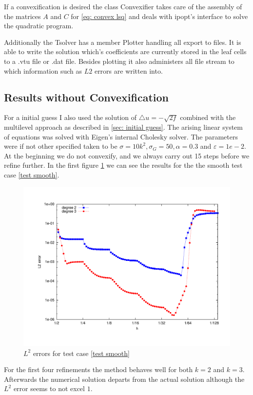 If a convexification is desired the class Convexifier takes care of the assembly of the matrices $A$ and $C$ for \eqref{eq: convex lsq} and deals with ipopt's interface to solve the quadratic program.

Additionally the Tsolver has a member Plotter handling all export to files. It is able to write the solution which's coefficients are currently stored in the leaf cells to a .vtu file or .dat file. Besides plotting it also administers all file stream to which information such as $L2$ errors are written into.

\subsection{Results without Convexification}

For a initial guess I also used the solution of $\triangle u = -\sqrt{2f}$ combined with the multilevel approach as described in \ref{sec: initial guess}.
The arising linear system of equations was solved with Eigen's internal Cholesky solver.
The parameters were if not other specified taken to be $\sigma=10 k^2, \sigma_G = 50, \alpha =
0.3$ and $\varepsilon = 1e-2$. At the beginning we do not convexify, and we always carry out 15 steps before we refine further. 
In the first figure \ref{fig: l2 errors test smooth ourMethod} we can see the results for the the smooth test case \ref{test smooth}.
\begin{figure}[h!]
	\centering
	\includegraphics[scale =0.4]{plots/MA1.pdf}
	\caption{$L^2$ errors for test case \ref{test smooth}}
	\label{fig: l2 errors test smooth ourMethod}
\end{figure}
 For the first four refinements the method behaves well for both $k=2$ and $k=3$. Afterwards the numerical solution departs from the actual solution although the $L^2$ error seems to not excel $1$.
 
